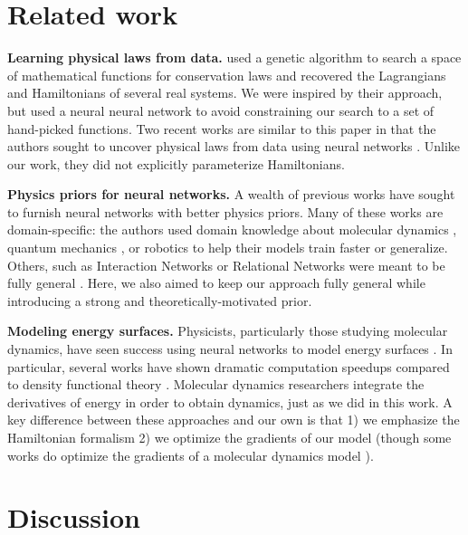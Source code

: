 \documentclass{article}
\begin{document}
\section{Related work}   

\textbf{Learning physical laws from data.} \citet{Schmidt2009Distilling} used a genetic algorithm to search a space of mathematical functions for conservation laws and recovered the Lagrangians and Hamiltonians of several real systems. We were inspired by their approach, but used a neural neural network to avoid constraining our search to a set of hand-picked functions. Two recent works are similar to this paper in that the authors sought to uncover physical laws from data using neural networks \cite{Iten2018Discovering, bondesan2019learning}. Unlike our work, they did not explicitly parameterize Hamiltonians.

\textbf{Physics priors for neural networks.} A wealth of previous works have sought to furnish neural networks with better physics priors. Many of these works are domain-specific: the authors used domain knowledge about molecular dynamics \cite{rupp2012fast,smith2017ani,chmiela2017machine, pukrittayakamee2009simultaneous}, quantum mechanics \cite{schutt2017quantum}, or robotics \cite{lutter2019deep} to help their models train faster or generalize. Others, such as Interaction Networks or Relational Networks were meant to be fully general \cite{Watters2017Visual, Santoro2017Simple, battaglia2016interaction}. Here, we also aimed to keep our approach fully general while introducing a strong and theoretically-motivated prior.

\textbf{Modeling energy surfaces.} Physicists, particularly those studying molecular dynamics, have seen success using neural networks to model energy surfaces \cite{behler2011neural, gastegger2015high, schutt2017quantum, yao2018tensormol}. In particular, several works have shown dramatic computation speedups compared to density functional theory \cite{rupp2012fast,smith2017ani,chmiela2017machine}. Molecular dynamics researchers integrate the derivatives of energy in order to obtain dynamics, just as we did in this work. A key difference between these approaches and our own is that 1) we emphasize the Hamiltonian formalism 2) we optimize the gradients of our model (though some works do optimize the gradients of a molecular dynamics model \cite{Wang2018Machine, pukrittayakamee2009simultaneous}).

\section{Discussion}   
\end{document}
